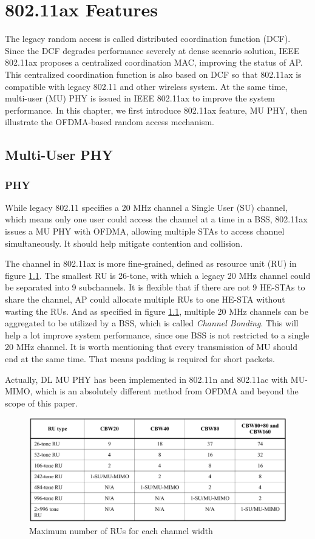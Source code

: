 \chapter{802.11ax Features}			\label{chp_ax_feature}
The legacy random access is called distributed coordination function (DCF). 
Since the DCF degrades performance severely at dense scenario solution, IEEE 802.11ax proposes a centralized coordination MAC, improving the status of AP. 
This centralized coordination function is also based on DCF so that 802.11ax is compatible with legacy 802.11 and other wireless system. 
At the same time, multi-user (MU) PHY is issued in IEEE 802.11ax to improve the system performance\cite{dengquality}. 
In this chapter, we first introduce 802.11ax feature, MU PHY, then illustrate the OFDMA-based random access mechanism.
\section{Multi-User PHY} \label{sec_MU}
\subsection{PHY}
While legacy 802.11 specifies a 20 MHz channel a Single User (SU) channel, which means only one user could access the channel at a time in a BSS, 802.11ax issues a MU PHY with OFDMA, allowing multiple STAs to access channel simultaneously.
It should help mitigate contention and collision. 

The channel in 802.11ax is more fine-grained, defined as resource unit (RU) in figure \ref{fig_RU_spec}. 
The smallest RU is 26-tone, with which a legacy 20 MHz channel could be separated into 9 subchannels.
It is flexible that if there are not 9 HE-STAs to share the channel, AP could allocate multiple RUs to one HE-STA without wasting the RUs.
And as specified in figure \ref{fig_RU_spec}, multiple 20 MHz channels can be aggregated to be utilized by a BSS, which is called \textit{Channel Bonding}. 
This will help a lot improve system performance, since one BSS is not restricted to a single 20 MHz channel.  
It is worth mentioning that every transmission of MU should end at the same time. That means padding is required for short packets.



Actually, DL MU PHY has been implemented in 802.11n and 802.11ac with MU-MIMO, which is an absolutely different method from OFDMA and beyond the scope of this paper. 

\begin{figure}[!t]
\includegraphics[scale=0.25]{./figure/chp2/RU_spec.png}
\caption{Maximum number of RUs for each channel width}
\label{fig_RU_spec}
\end{figure}


